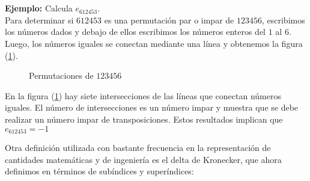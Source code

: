 \\[1em]
\noindent{}
\\[1em]
\noindent
\textbf{Ejemplo: } Calcula $e_{612453}$.
\\[1em]
\noindent
Para determinar si $612453$ es una permutación par o impar de $123456$, escribimos los números dados y debajo de ellos escribimos los números enteros del $1$ al $6$. Luego, los números iguales se conectan mediante una línea y obtenemos la figura (\ref{fig:figura_01_02}).
\begin{figure}[H]
\centering
{}
\caption{Permutaciones de $123456$}
\label{fig:figura_01_02}
\end{figure}
En la figura (\ref{fig:figura_01_02}) hay siete intersecciones de las líneas que conectan números iguales. El número de intersecciones es un número impar y muestra que se debe realizar un número impar de transposiciones. Estos resultados implican que $e_{612453} = -1$
\par
Otra definición utilizada con bastante frecuencia en la representación de cantidades matemáticas y de ingeniería es el delta de Kronecker, que ahora definimos en términos de subíndices y superíndices:

